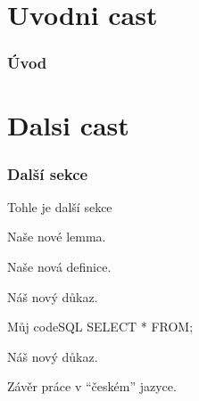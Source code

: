 \documentclass[a4paper,12pt]{article}
\begin{document}
\maketitle

\upthanksanot

\uptocandlists

\part{Uvodni cast}
\section{Úvod}

\part{Dalsi cast}
\section{Další sekce}
Tohle je další sekce

\begin{uplemma}
Naše nové lemma.
\end{uplemma}


\begin{uptheorem}
Naše nová  definice.
\end{uptheorem}

\begin{upproof}
Náš nový důkaz.
\end{upproof}

\begin{upcode}{Můj code}{}{SQL}
SELECT * FROM;
\end{upcode}


\begin{upquote}
Náš nový důkaz. 
\end{upquote}

\upendofmainmatter

\begin{upconclusions}[czech]
Závěr práce v \enquote{českém} jazyce.
\end{upconclusions}
\end{document}

